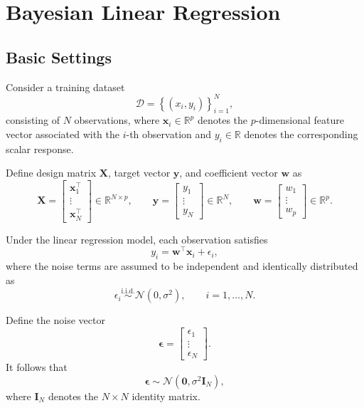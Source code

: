 \documentclass[../Bayesian_Inference.tex]{subfiles}
\begin{document}
\section{Bayesian Linear Regression}

\subsection{Basic Settings}

Consider a training dataset 
\[
    \mathcal{D} = \left\{(x_i,y_i)\right\}_{i=1}^{N},
\]
consisting of $N$ observations, where $\bm{x}_i \in \mathbb{R}^{p}$ denotes the $p$-dimensional feature vector associated with the $i$-th observation and $y_i \in \mathbb{R}$ denotes the corresponding scalar response. 

Define design matrix $\mathbf{X}$, target vector $\bm{y}$, and coefficient vector $\bm{w}$ as 
\[
    \mathbf{X} = \begin{bmatrix}
        \bm{x}_1^{\top} \\
        \vdots \\
        \bm{x}_N^{\top}
    \end{bmatrix} \in \mathbb{R}^{N \times p}, \qquad
    \bm{y} = \begin{bmatrix}
        {y}_1 \\
        \vdots \\
        {y}_N
    \end{bmatrix} \in \mathbb{R}^{N}, \qquad
    \bm{w} = \begin{bmatrix}
        {w}_1 \\
        \vdots \\
        {w}_p
    \end{bmatrix} \in \mathbb{R}^{p}.
\]

Under the linear regression model, each observation satisfies
\[
    y_i = \bm{w}^{\top} \bm{x}_i + \epsilon_i,
\]
where the noise terms are assumed to be independent and identically distributed as
\[
    \epsilon_i \overset{\mathrm{i.i.d.}}{\sim}\mathcal N(0,\sigma^2), \qquad i=1,\dots,N.
\]

Define the noise vector
\[
    \bm{\epsilon} = \begin{bmatrix}
        \epsilon_1 \\
        \vdots \\
        \epsilon_N
    \end{bmatrix}.
\]
It follows that
\[
    \bm\epsilon \sim \mathcal N(\bm 0,\sigma^2\mathbf I_N),
\]
where $\mathbf{I}_N$ denotes the $N\times N$ identity matrix.
\end{document}
